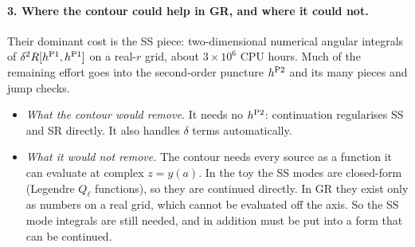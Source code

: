 \documentclass[11pt,a4paper]{article}
\begin{document}
\paragraph{3. Where the contour could help in GR, and where it could not.}
Their dominant cost is the SS piece: two-dimensional numerical angular integrals of $\delta^2R[h^{\rm P1},h^{\rm P1}]$ on a real-$r$ grid, about $3\times10^6$ CPU hours.
Much of the remaining effort goes into the second-order puncture $h^{\rm P2}$ and its many pieces and jump checks.
\begin{itemize}[nosep]
\item \emph{What the contour would remove.}
  It needs no $h^{\rm P2}$: continuation regularises SS and SR directly. It also handles $\delta$ terms automatically.
\item \emph{What it would not remove.}
  The contour needs every source as a function it can evaluate at complex $z=y(a)$.
  In the toy the SS modes are closed-form (Legendre $Q_\ell$ functions), so they are continued directly.
  In GR they exist only as numbers on a real grid, which cannot be evaluated off the axis.
  So the SS mode integrals are still needed, and in addition must be put into a form that can be continued.
\end{itemize}
\end{document}
